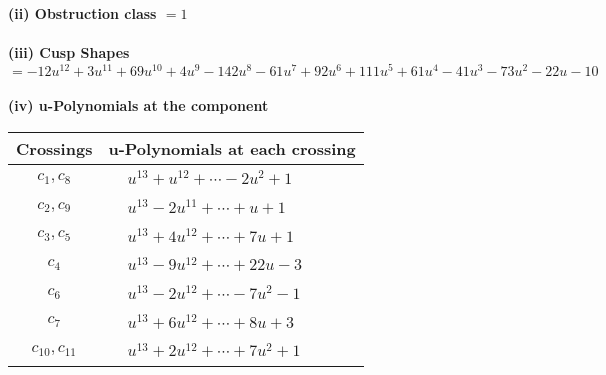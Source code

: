 \documentclass[1p]{elsarticle_modified}
\theoremstyle{definition}
\begin{document}
\flushleft \textbf{(ii) Obstruction class $= 1$}\\~\\
\flushleft \textbf{(iii) Cusp Shapes $= -12 u^{12}+3 u^{11}+69 u^{10}+4 u^9-142 u^8-61 u^7+92 u^6+111 u^5+61 u^4-41 u^3-73 u^2-22 u-10$}\\~\\
\newpage\renewcommand{\arraystretch}{1}
\flushleft \textbf{(iv) u-Polynomials at the component}\newline \\
\begin{tabular}{m{50pt}|m{274pt}}
Crossings & \hspace{64pt}u-Polynomials at each crossing \\
\hline $$\begin{aligned}c_{1},c_{8}\end{aligned}$$&$\begin{aligned}
&u^{13}+u^{12}+\cdots-2 u^2+1
\end{aligned}$\\
\hline $$\begin{aligned}c_{2},c_{9}\end{aligned}$$&$\begin{aligned}
&u^{13}-2 u^{11}+\cdots+u+1
\end{aligned}$\\
\hline $$\begin{aligned}c_{3},c_{5}\end{aligned}$$&$\begin{aligned}
&u^{13}+4 u^{12}+\cdots+7 u+1
\end{aligned}$\\
\hline $$\begin{aligned}c_{4}\end{aligned}$$&$\begin{aligned}
&u^{13}-9 u^{12}+\cdots+22 u-3
\end{aligned}$\\
\hline $$\begin{aligned}c_{6}\end{aligned}$$&$\begin{aligned}
&u^{13}-2 u^{12}+\cdots-7 u^2-1
\end{aligned}$\\
\hline $$\begin{aligned}c_{7}\end{aligned}$$&$\begin{aligned}
&u^{13}+6 u^{12}+\cdots+8 u+3
\end{aligned}$\\
\hline $$\begin{aligned}c_{10},c_{11}\end{aligned}$$&$\begin{aligned}
&u^{13}+2 u^{12}+\cdots+7 u^2+1
\end{aligned}$\\
\hline
\end{tabular}\\~\\
\end{document}
